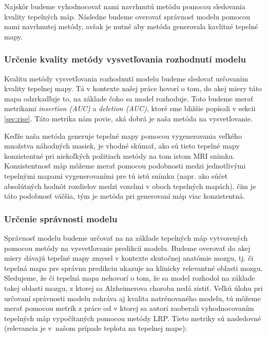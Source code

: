 Najskôr budeme vyhodnocovať nami navrhnutú metódu pomocou sledovania kvality tepelných máp. Následne budeme overovať správnosť modelu pomocou nami navrhnutej metódy, avšak je nutné aby metóda generovala kavlitné tepelné mapy.

\subsubsection{Určenie kvality metódy vysvetľovania rozhodnutí modelu \label{sec:evaluation_design_method_quality}}

Kvalitu metódy vysvetľovania rozhodnutí modelu budeme sledovať určovaním kvality tepelnej mapy. Tá v kontexte našej práce hovorí o tom, do akej miery táto mapa odzrkadľuje to, na základe čoho sa model rozhoduje. Toto budeme merať metrikami \textit{insertion (AUC)} a \textit{deletion (AUC)}, ktoré sme bližšie popísali v sekcii \ref{sec:rise}. Táto metrika nám povie, aká dobrá je naša metóda na vysvetľovanie.

Keďže naša metóda generuje tepelné mapy pomocou vygenerovania veľkého množstva náhodných masiek, je vhodné skúmať, ako sú tieto tepelné mapy konzistentné pri niekoľkých požitiach metódy na tom istom MRI snímku. Konzistentnosť máp môžeme merať pomocou podobnosti medzi jednotlivými tepelnými mapami vygenerovaními pre tú istú snímku (napr. ako súčet absolútných hodnôt rozdielov medzi voxelmi v oboch tepelných mapách). čím je táto podobnosť väčšia, tým je metóda pri generovaní máp viac konzistentná.

\subsubsection{Určenie správnosti modelu \label{sec:heat_maps_and_model_segmentation_masks}}

Správnosť modelu budeme určovať na na základe tepelných máp vytvorených pomocou metódy na vysvetľovanie predikcií modelu. Budeme overovať do akej miery dávajú tepelné mapy zmysel v kontexte skutočnej anatómie mozgu, tj. či tepelná mapa pre správnu predikciu ukazuje na klinicky relevantné oblasti mozgu. Sledujeme, že či tepelná mapa nehovorí o tom, že sa model rozhodol na základe takej oblasti mozgu, z ktorej sa Alzheimerova choroba nedá zistiť. Veľkú úlohu pri určovaní správnosti modelu zohráva aj kvalita natrénovaného modelu, tú môžeme merať pomocou metrík z práce od \citeauthor*{bohle2019layer} v ktorej sa autori zaoberali vyhodnocovaním tepelných máp vypočítaných pomocou metódy LRP. Tieto metriky sú nasledovné (relevancia je v našom prípade teplota na tepelnej mape):

